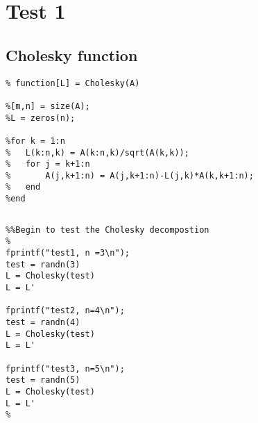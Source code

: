 \documentclass[10pt]{article}
\begin{document}
{\Huge\section*{Test 1}}

\tableofcontents
\vspace*{4em}



{}
\subsection*{Cholesky function}

\begin{lstlisting}
% function[L] = Cholesky(A)

%[m,n] = size(A);
%L = zeros(n);

%for k = 1:n
%	L(k:n,k) = A(k:n,k)/sqrt(A(k,k));
%	for j = k+1:n
%		A(j,k+1:n) = A(j,k+1:n)-L(j,k)*A(k,k+1:n);
%	end
%end
\end{lstlisting}
\begin{lstlisting}[language={},xleftmargin=5pt,frame=none]

\end{lstlisting}
\begin{lstlisting}
%%Begin to test the Cholesky decompostion
%
fprintf("test1, n =3\n");
test = randn(3)
L = Cholesky(test)
L = L'

fprintf("test2, n=4\n");
test = randn(4)
L = Cholesky(test)
L = L'

fprintf("test3, n=5\n");
test = randn(5)
L = Cholesky(test)
L = L'
%
\end{lstlisting}
\end{document}
